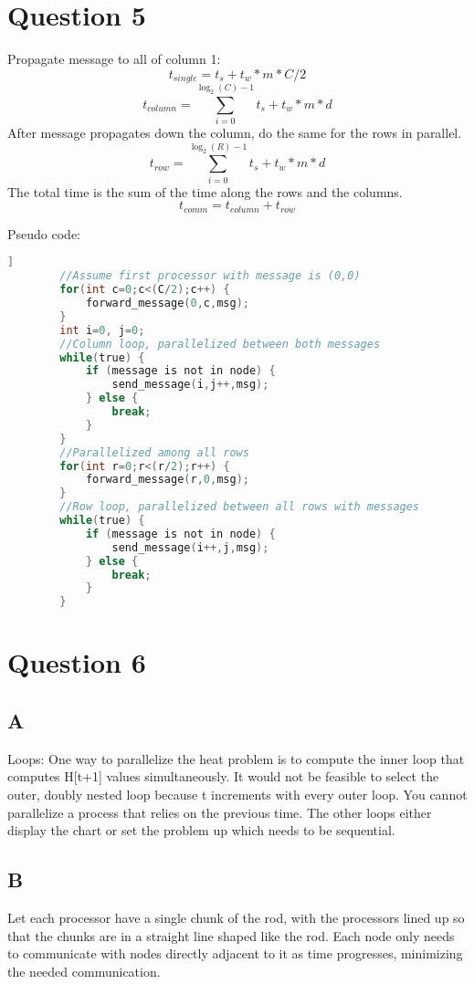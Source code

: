 \documentclass[12pt]{article}
\begin{document}
    \section{Question 5}
    Propagate message to all of column 1:
    \begin{displaymath}
        t_{single}=t_s+t_w*m*C/2
    \end{displaymath}
    \begin{displaymath}
        t_{column}=\sum_{i=0}^{\log_2(C)-1} t_s+t_w*m*d
    \end{displaymath}
    After message propagates down the column, do the same for the rows in parallel.
    \begin{displaymath}
        t_{row}=\sum_{i=0}^{\log_2(R)-1} t_s+t_w*m*d
    \end{displaymath}
    The total time is the sum of the time along the rows and the columns.
    \begin{displaymath}
        t_{comm}=t_{column}+t_{row}
    \end{displaymath}

    Pseudo code:
    \begin{lstlisting}[language=C]]
        //Assume first processor with message is (0,0)
        for(int c=0;c<(C/2);c++) {
            forward_message(0,c,msg);
        }
        int i=0, j=0;
        //Column loop, parallelized between both messages
        while(true) {
            if (message is not in node) {
                send_message(i,j++,msg);
            } else {
                break;
            }
        }
        //Parallelized among all rows
        for(int r=0;r<(r/2);r++) {
            forward_message(r,0,msg);
        }
        //Row loop, parallelized between all rows with messages
        while(true) {
            if (message is not in node) {
                send_message(i++,j,msg);
            } else {
                break;
            }
        }
    \end{lstlisting}
    \section{Question 6}
    \subsection*{A}
    Loops: One way to parallelize the heat problem is to compute the inner loop that computes H[t+1] values simultaneously. It would not be feasible to select the outer, doubly nested loop because t increments with every outer loop. You cannot parallelize a process that relies on the previous time. The other loops either display the chart or set the problem up which needs to be sequential.
    \subsection*{B}
    Let each processor have a single chunk of the rod, with the processors lined up so that the chunks are in a straight line shaped like the rod. Each node only needs to communicate with nodes directly adjacent to it as time progresses, minimizing the needed communication.
\end{document}

